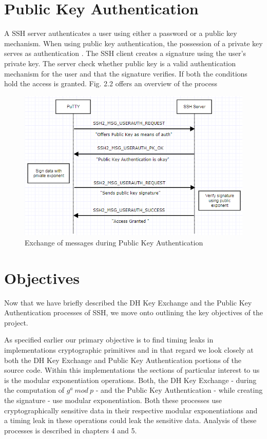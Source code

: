 \documentclass{report}
\begin{document}
\section{Public Key Authentication}
A SSH server authenticates a user using either a password or a public key mechanism. When using public key authentication, the possession of a private key serves as authentication \cite{rfc4252}. The SSH client creates a signature using the user's private key. The server check whether public key is a valid authentication mechanism for the user and that the signature verifies. If both the conditions hold the access is granted. Fig. 2.2 offers an overview of the process\par
\begin{figure}[ht]
\caption{Exchange of messages during Public Key Authentication}
\centering
\includegraphics[width=1\textwidth]{SSH_PK_Auth.png}
\end{figure}
\section{Objectives}
\par
Now that we have briefly described the DH Key Exchange and the Public Key Authentication processes of SSH, we move onto outlining the key objectives of the project.\par
As specified earlier our primary objective is to find timing leaks in implementations cryptographic primitives and in that regard we look closely at both the DH Key Exchange and Public Key Authentication portions of the source code. Within this implementations the sections of particular interest to us is the modular exponentiation operations. Both, the DH Key Exchange - during the computation of \(g^a\ mod\ p\) - and the Public Key Authentication - while creating the signature - use modular exponentiation. Both these processes use cryptographically sensitive data in their respective modular exponentiations and a timing leak in these operations could leak the sensitive data. Analysis of these processes is described in chapters 4 and 5.\par
\end{document}
